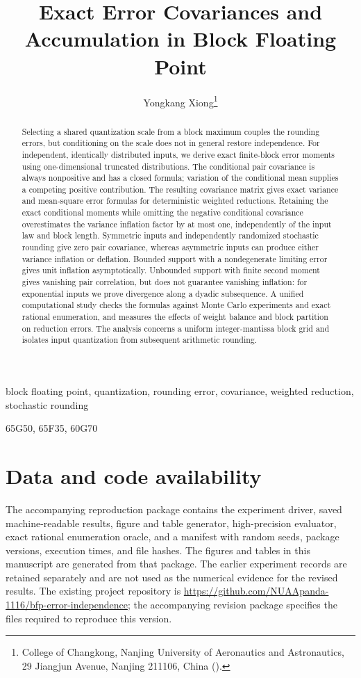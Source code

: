 \documentclass[review,hidelinks,letterpaper]{siamart251216}
\title{Exact Error Covariances and Accumulation in Block Floating Point}
\author{Yongkang Xiong\thanks{College of Changkong, Nanjing University of
Aeronautics and Astronautics, 29 Jiangjun Avenue, Nanjing 211106, China
(\email{nuaapanda@outlook.com}).}}
\begin{document}
\maketitle
\begin{abstract}
Selecting a shared quantization scale from a block maximum couples the
rounding errors, but conditioning on the scale does not in general restore independence.
For independent, identically distributed inputs, we derive exact finite-block
error moments using one-dimensional truncated distributions. The conditional
pair covariance is always nonpositive and has a closed formula; variation of
the conditional mean supplies a competing positive contribution. The resulting
covariance matrix gives exact variance and mean-square error formulas for
deterministic weighted reductions. Retaining the exact conditional moments
while omitting the negative conditional covariance overestimates the variance
inflation factor by at most one, independently of the input law and block
length. Symmetric inputs and independently randomized stochastic rounding give
zero pair covariance, whereas asymmetric inputs can produce either variance
inflation or deflation. Bounded support with a nondegenerate limiting error
gives unit inflation asymptotically. Unbounded support with finite second moment
gives vanishing pair correlation, but does not guarantee vanishing inflation:
for exponential inputs we prove divergence along a dyadic subsequence.
A unified computational study checks the formulas against Monte Carlo
experiments and exact rational enumeration, and measures the effects of weight
balance and block partition on reduction errors. The analysis concerns a
uniform integer-mantissa block grid and isolates input quantization from
subsequent arithmetic rounding.
\end{abstract}
\begin{keywords}
block floating point, quantization, rounding error, covariance,
weighted reduction, stochastic rounding
\end{keywords}
\begin{AMS}
65G50, 65F35, 60G70
\end{AMS}





\section*{Data and code availability}
The accompanying reproduction package contains the experiment driver, saved
machine-readable results, figure and table generator, high-precision evaluator,
exact rational enumeration oracle, and a manifest with random seeds, package
versions, execution times, and file hashes. The figures and tables in this
manuscript are generated from that package. The earlier experiment records
are retained separately and are not used as the numerical evidence for the
revised results. The existing project repository is
\url{https://github.com/NUAApanda-1116/bfp-error-independence}; the accompanying
revision package specifies the files required to reproduce this version.


\end{document}
